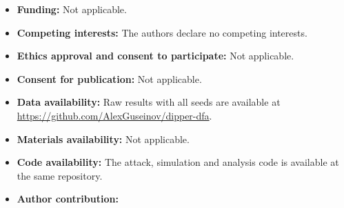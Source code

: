 \documentclass[pdflatex,sn-mathphys-num]{sn-jnl}
\theoremstyle{thmstyleone}%
\theoremstyle{thmstylethree}%
\begin{document}
\begin{itemize}
\item \textbf{Funding:} Not applicable. %
\item \textbf{Competing interests:} The authors declare no competing interests.
\item \textbf{Ethics approval and consent to participate:} Not applicable.
\item \textbf{Consent for publication:} Not applicable.
\item \textbf{Data availability:} Raw results with all seeds are available at \url{https://github.com/AlexGuseinov/dipper-dfa}. %
\item \textbf{Materials availability:} Not applicable.
\item \textbf{Code availability:} The attack, simulation and analysis code is available at the same repository.
\item \textbf{Author contribution:} %
\end{itemize}


\end{document}
